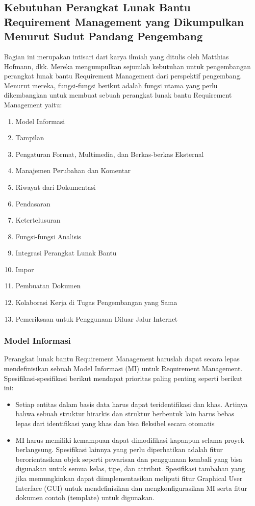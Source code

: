 \subsection{Kebutuhan Perangkat Lunak Bantu \f{Requirement Management} yang Dikumpulkan Menurut Sudut Pandang Pengembang}
Bagian ini merupakan intisari dari karya ilmiah yang ditulis oleh Matthias Hofmann, dkk. Mereka mengumpulkan sejumlah kebutuhan untuk pengembangan perangkat lunak bantu \f{Requirement Management} dari perspektif pengembang. Menurut mereka, fungsi-fungsi berikut adalah fungsi utama yang perlu dikembangkan untuk membuat sebuah perangkat lunak bantu \f{Requirement Management} yaitu\cite{reqm.requirements}:
\begin{enumerate}
\item Model Informasi
\item Tampilan
\item Pengaturan Format, Multimedia, dan Berkas-berkas Eksternal
\item Manajemen Perubahan dan Komentar
\item Riwayat dari Dokumentasi
\item Pendasaran
\item Ketertelusuran
\item Fungsi-fungsi Analisis
\item Integrasi Perangkat Lunak Bantu
\item Impor
\item Pembuatan Dokumen
\item Kolaborasi Kerja di Tugas Pengembangan yang Sama
\item Pemeriksaan untuk Penggunaan Diluar Jalur Internet
\end{enumerate}
\subsubsection{Model Informasi}
Perangkat lunak bantu Requirement Management haruslah dapat secara lepas mendefinisikan sebuah Model Informasi (MI) untuk Requirement Management. Spesifikasi-spesifikasi berikut mendapat prioritas paling penting seperti berikut ini:
\begin{itemize}
\item Setiap entitas dalam basis data harus dapat teridentifikasi dan khas. Artinya bahwa sebuah struktur hirarkis dan struktur berbentuk lain harus bebas lepas dari identifikasi yang khas dan bisa fleksibel secara otomatis
\item MI harus memiliki kemampuan dapat dimodifikasi kapanpun selama proyek berlangsung.
Spesifikasi lainnya yang perlu diperhatikan adalah fitur berorientasikan objek seperti pewarisan dan penggunaan kembali yang bisa digunakan untuk semua kelas, tipe, dan attribut. Spesifikasi tambahan yang jika memungkinkan dapat diimplementasikan meliputi fitur Graphical User Interface (GUI) untuk mendefinisikan dan mengkonfigurasikan MI serta fitur dokumen contoh (template) untuk digunakan.
\end{itemize}
